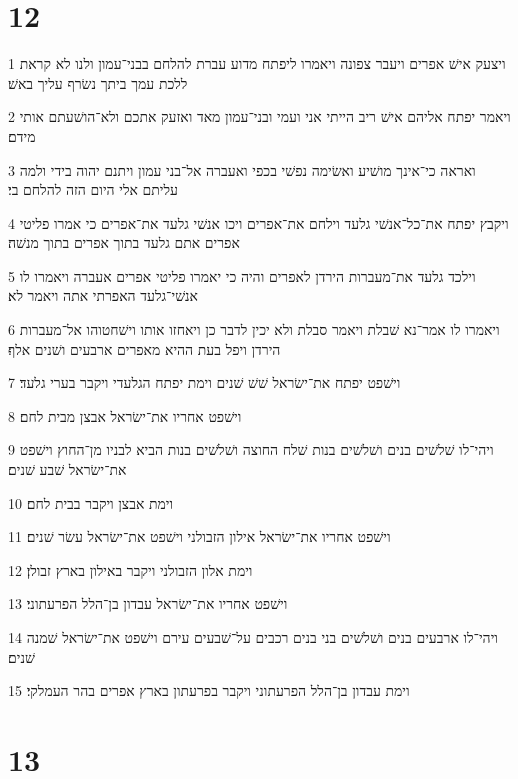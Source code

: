 \chapter{12}

\par 1 ויצעק אישׁ אפרים ויעבר צפונה ויאמרו ליפתח מדוע עברת להלחם בבני־עמון ולנו לא קראת ללכת עמך ביתך נשׂרף עליך באשׁ׃
\par 2 ויאמר יפתח אליהם אישׁ ריב הייתי אני ועמי ובני־עמון מאד ואזעק אתכם ולא־הושׁעתם אותי מידם׃
\par 3 ואראה כי־אינך מושׁיע ואשׂימה נפשׁי בכפי ואעברה אל־בני עמון ויתנם יהוה בידי ולמה עליתם אלי היום הזה להלחם בי׃
\par 4 ויקבץ יפתח את־כל־אנשׁי גלעד וילחם את־אפרים ויכו אנשׁי גלעד את־אפרים כי אמרו פליטי אפרים אתם גלעד בתוך אפרים בתוך מנשׁה׃
\par 5 וילכד גלעד את־מעברות הירדן לאפרים והיה כי יאמרו פליטי אפרים אעברה ויאמרו לו אנשׁי־גלעד האפרתי אתה ויאמר לא׃
\par 6 ויאמרו לו אמר־נא שׁבלת ויאמר סבלת ולא יכין לדבר כן ויאחזו אותו וישׁחטוהו אל־מעברות הירדן ויפל בעת ההיא מאפרים ארבעים ושׁנים אלף׃
\par 7 וישׁפט יפתח את־ישׂראל שׁשׁ שׁנים וימת יפתח הגלעדי ויקבר בערי גלעד׃
\par 8 וישׁפט אחריו את־ישׂראל אבצן מבית לחם׃
\par 9 ויהי־לו שׁלשׁים בנים ושׁלשׁים בנות שׁלח החוצה ושׁלשׁים בנות הביא לבניו מן־החוץ וישׁפט את־ישׂראל שׁבע שׁנים׃
\par 10 וימת אבצן ויקבר בבית לחם׃
\par 11 וישׁפט אחריו את־ישׂראל אילון הזבולני וישׁפט את־ישׂראל עשׂר שׁנים׃
\par 12 וימת אלון הזבולני ויקבר באילון בארץ זבולן׃
\par 13 וישׁפט אחריו את־ישׂראל עבדון בן־הלל הפרעתוני׃
\par 14 ויהי־לו ארבעים בנים ושׁלשׁים בני בנים רכבים על־שׁבעים עירם וישׁפט את־ישׂראל שׁמנה שׁנים׃
\par 15 וימת עבדון בן־הלל הפרעתוני ויקבר בפרעתון בארץ אפרים בהר העמלקי׃

\chapter{13}

